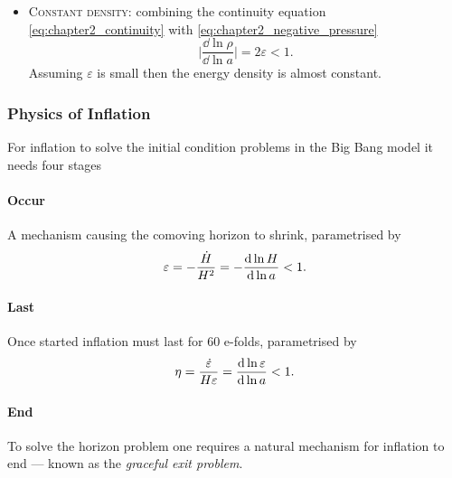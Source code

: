 \begin{itemize}
	\item \textsc{Constant density}:
	      combining the continuity equation \cref{eq:chapter2_continuity} with \cref{eq:chapter2_negative_pressure}
	      \begin{equation}
		      \bigg\lvert\frac{\dd{\ln{\rho}}}{\dd{\ln{a}}}\bigg\rvert
		      = 2\varepsilon
		      < 1.
	      \end{equation}
	      Assuming \({\varepsilon}\) is small then the energy density is almost constant.
\end{itemize}

\subsubsection{Physics of Inflation}

For inflation to solve the initial condition problems in the Big Bang model it needs four stages

\paragraph{Occur} A mechanism causing the comoving horizon to shrink, parametrised by
%
\begin{equation}
	\varepsilon
	= -\frac{\dot{H}}{H^{2}}
	= -\dv{\ln{H}}{\ln{a}}
	< 1.
\end{equation}

\paragraph{Last}

Once started inflation must last for 60 e-folds, parametrised by
%
\begin{equation}
	\eta
	= \frac{\dot{\varepsilon}}{H\varepsilon}
	= \dv{\ln{\varepsilon}}{\ln{a}}
	< 1.
\end{equation}

\paragraph{End}

To solve the horizon problem one requires a natural mechanism for inflation to end --- known as the \emph{graceful exit problem}.

